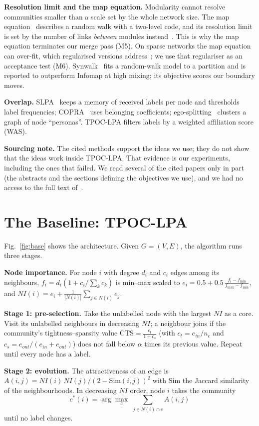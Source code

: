 \documentclass[conference]{IEEEtran}
\begin{document}
\textbf{Resolution limit and the map equation.} Modularity cannot resolve communities smaller than a scale set by the whole network size. The map equation~\cite{rosvall2008} describes a random walk with a two-level code, and its resolution limit is set by the number of links \emph{between} modules instead~\cite{kawamoto2015}. This is why the map equation terminates our merge pass (M5). On sparse networks the map equation can over-fit, which regularised versions address~\cite{smiljanic2020}; we use that regulariser as an acceptance test (M6). Synwalk~\cite{toth2022} fits a random-walk model to a partition and is reported to outperform Infomap at high mixing; its objective scores our boundary moves.

\textbf{Overlap.} SLPA~\cite{xie2011} keeps a memory of received labels per node and thresholds label frequencies; COPRA~\cite{gregory2010} uses belonging coefficients; ego-splitting~\cite{epasto2017} clusters a graph of node ``personas''. TPOC-LPA filters labels by a weighted affiliation score (WAS).

\textbf{Sourcing note.} The cited methods support the ideas we use; they do not show that the ideas work inside TPOC-LPA. That evidence is our experiments, including the ones that failed. We read several of the cited papers only in part (the abstracts and the sections defining the objectives we use), and we had no access to the full text of~\cite{li2020motif}.

\section{The Baseline: TPOC-LPA}\label{sec:base}
Fig.~\ref{fig:base} shows the architecture. Given $G=(V,E)$, the algorithm runs three stages.

\textbf{Node importance.} For node $i$ with degree $d_i$ and $c_i$ edges among its neighbours, $f_i=d_i(1+c_i/\sum_k c_k)$ is min--max scaled to $e_i=0.5+0.5\,\frac{f_i-f_{\min}}{f_{\max}-f_{\min}}$, and $NI(i)=e_i+\frac{1}{|N(i)|}\sum_{j\in N(i)}e_j$.

\textbf{Stage 1: pre-selection.} Take the unlabelled node with the largest $NI$ as a core. Visit its unlabelled neighbours in decreasing $NI$; a neighbour joins if the community's tightness--sparsity value $\mathrm{CTS}=\frac{c_t}{1+c_s}$ (with $c_t=e_{in}/n_c$ and $c_s=e_{out}/(e_{in}+e_{out})$) does not fall below $\alpha$ times its previous value. Repeat until every node has a label.

\textbf{Stage 2: evolution.} The attractiveness of an edge is $A(i,j)=NI(i)\,NI(j)/(2-\mathrm{Sim}(i,j))^2$ with $\mathrm{Sim}$ the Jaccard similarity of the neighbourhoods. In decreasing $NI$ order, node $i$ takes the community
\begin{equation}
c^{*}(i)=\arg\max_{c}\;\sum_{j\in N(i)\cap c}A(i,j)\label{eq:stage2}
\end{equation}
until no label changes.
\end{document}
